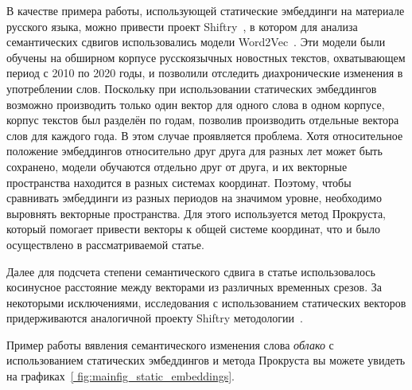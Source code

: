 \documentclass[LI,VKR]{HSEUniversity}
\begin{document}
В качестве примера работы, использующей статические эмбеддинги на материале русского языка,
можно привести проект Shiftry~\cite{shiftry},
в котором для анализа семантических сдвигов использовались модели Word2Vec~\cite{Word2VecModelAnalysis}.
Эти модели были обучены на обширном корпусе русскоязычных новостных текстов,
охватывающем период с 2010 по 2020 годы, и позволили отследить диахронические изменения
в употреблении слов.
Поскольку при использовании статических эмбеддингов возможно производить
только один вектор для одного слова в одном корпусе,
корпус текстов был разделён по годам,
позволив производить отдельные вектора слов для каждого года.
В этом случае проявляется проблема.
Хотя относительное положение эмбеддингов относительно друг друга для разных лет может быть сохранено,
модели обучаются отдельно друг от друга,
и их векторные пространства находится в разных системах координат.
Поэтому, чтобы сравнивать эмбеддинги из разных периодов на значимом уровне,
необходимо выровнять векторные пространства.
Для этого используется метод Прокруста, который помогает привести векторы к общей системе координат,
что и было осуществлено в рассматриваемой статье.

Далее для подсчета степени семантического сдвига в статье использовалось косинусное расстояние между
векторами из различных временных срезов.
За некоторыми исключениями, исследования с использованием статических векторов
придерживаются аналогичной проекту Shiftry методологии~\cite{TahmasebiComputationalApproachesToSemanticChange}.

Пример работы вявления семантического изменения слова \textit{облако} с использованием
статических эмбеддингов и метода Прокруста вы можете увидеть на графиках~\ref{
    fig:mainfig_static_embeddings}.
\end{document}
